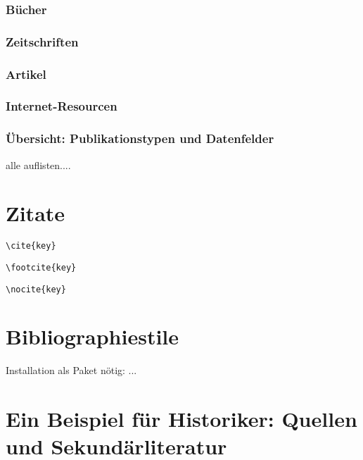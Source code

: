 \subsubsection{Bücher}

\subsubsection{Zeitschriften}

\subsubsection{Artikel}

\subsubsection{Internet-Resourcen}

\subsubsection{Übersicht: Publikationstypen und Datenfelder}

alle auflisten....


\section{Zitate}

\lstinline/\cite{key}/

\lstinline/\footcite{key}/

\lstinline/\nocite{key}/




\section{Bibliographiestile}




Installation als Paket nötig:
...



\section{Ein Beispiel für Historiker: Quellen und Sekundärliteratur}


